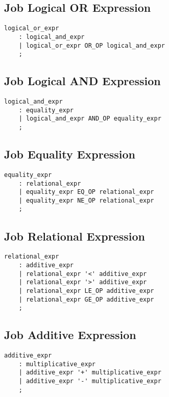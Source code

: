 \documentclass[prodmode,acmtecs]{acmsmall}
\begin{document}

\subsection{Job Logical OR Expression}

\begin{lstlisting}
logical_or_expr
	: logical_and_expr
	| logical_or_expr OR_OP logical_and_expr
	;
\end{lstlisting}

\subsection{Job Logical AND Expression}

\begin{lstlisting}
logical_and_expr
	: equality_expr
	| logical_and_expr AND_OP equality_expr
	;
\end{lstlisting}

\subsection{Job Equality Expression}

\begin{lstlisting}
equality_expr
	: relational_expr
	| equality_expr EQ_OP relational_expr
	| equality_expr NE_OP relational_expr
	;
\end{lstlisting}

\subsection{Job Relational Expression}

\begin{lstlisting}
relational_expr
	: additive_expr
	| relational_expr '<' additive_expr
	| relational_expr '>' additive_expr
	| relational_expr LE_OP additive_expr
	| relational_expr GE_OP additive_expr
	;
\end{lstlisting}

\subsection{Job Additive Expression}

\begin{lstlisting}
additive_expr
	: multiplicative_expr
	| additive_expr '+' multiplicative_expr
	| additive_expr '-' multiplicative_expr
	;
\end{lstlisting}
\end{document}
